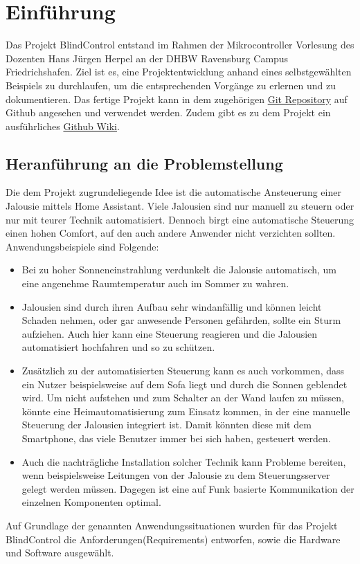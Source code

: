 \chapter{Einführung}
\label{cha:Einführung}
Das Projekt BlindControl entstand im Rahmen der Mikrocontroller Vorlesung des Dozenten Hans Jürgen Herpel an der DHBW Ravensburg Campus Friedrichshafen. Ziel ist es, eine Projektentwicklung anhand eines selbstgewählten Beispiels zu durchlaufen, um die entsprechenden Vorgänge zu erlernen und zu dokumentieren. Das fertige Projekt kann in dem zugehörigen \href{https://github.com/maxbachmann/BlindControl}{Git Repository} auf Github angesehen und verwendet werden. Zudem gibt es zu dem Projekt ein ausführliches \href{https://github.com/maxbachmann/BlindControl/wiki}{Github Wiki}.

\section{Heranführung an die Problemstellung}
Die dem Projekt zugrundeliegende Idee ist die automatische Ansteuerung einer Jalousie mittels Home Assistant. Viele Jalousien sind nur manuell zu steuern oder nur mit teurer Technik automatisiert. Dennoch birgt eine automatische Steuerung einen hohen Comfort, auf den auch andere Anwender nicht verzichten sollten. Anwendungsbeispiele sind Folgende:
\begin{itemize}
	\item Bei zu hoher Sonneneinstrahlung verdunkelt die Jalousie automatisch, um eine angenehme Raumtemperatur auch im Sommer zu wahren.
	\item Jalousien sind durch ihren Aufbau sehr windanfällig und können leicht Schaden nehmen, oder gar anwesende Personen gefährden, sollte ein Sturm aufziehen. Auch hier kann eine Steuerung reagieren und die Jalousien automatisiert hochfahren und so zu schützen.
	\item Zusätzlich zu der automatisierten Steuerung kann es auch vorkommen, dass ein Nutzer beispielsweise auf dem Sofa liegt und durch die Sonnen geblendet wird. Um nicht aufstehen und zum Schalter an der Wand laufen zu müssen, könnte eine Heimautomatisierung zum Einsatz kommen, in der eine manuelle Steuerung der Jalousien integriert ist. Damit könnten diese mit dem Smartphone, das viele Benutzer immer bei sich haben, gesteuert werden.
	\item Auch die nachträgliche Installation solcher Technik kann Probleme bereiten, wenn beispielsweise Leitungen von der Jalousie zu dem Steuerungsserver gelegt werden müssen. Dagegen ist eine auf Funk basierte Kommunikation der einzelnen Komponenten optimal.
\end{itemize}
Auf Grundlage der genannten Anwendungssituationen wurden für das Projekt BlindControl die Anforderungen(Requirements) entworfen, sowie die Hardware und Software ausgewählt.

